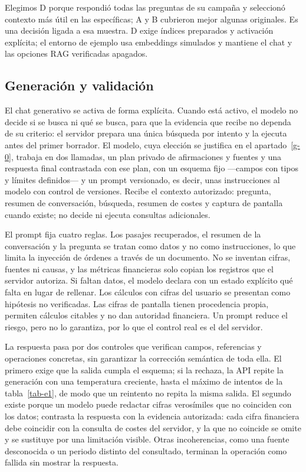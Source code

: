 Elegimos D porque respondió todas las preguntas de su campaña y seleccionó contexto más útil en las específicas; A y B cubrieron mejor algunas originales. Es una decisión ligada a esa muestra. D exige índices preparados y activación explícita; el entorno de ejemplo usa embeddings simulados y mantiene el chat y las opciones RAG verificadas apagados. \cite{despliegue}

\subsection{Generación y validación}\label{e-4}

El chat generativo se activa de forma explícita. Cuando está activo, el modelo no decide si se busca ni qué se busca, para que la evidencia que recibe no dependa de su criterio: el servidor prepara una única búsqueda por intento y la ejecuta antes del primer borrador. El modelo, cuya elección se justifica en el apartado~\ref{g-0}, trabaja en dos llamadas, un plan privado de afirmaciones y fuentes y una respuesta final contrastada con ese plan, con un esquema fijo ---campos con tipos y límites definidos--- y un prompt versionado, es decir, unas instrucciones al modelo con control de versiones. Recibe el contexto autorizado: pregunta, resumen de conversación, búsqueda, resumen de costes y captura de pantalla cuando existe; no decide ni ejecuta consultas adicionales. \cite{arquitectura}

El prompt fija cuatro reglas. Los pasajes recuperados, el resumen de la conversación y la pregunta se tratan como datos y no como instrucciones, lo que limita la inyección de órdenes a través de un documento. No se inventan cifras, fuentes ni causas, y las métricas financieras solo copian los registros que el servidor autoriza. Si faltan datos, el modelo declara con un estado explícito qué falta en lugar de rellenar. Los cálculos con cifras del usuario se presentan como hipótesis no verificadas. Las cifras de pantalla tienen procedencia propia, permiten cálculos citables y no dan autoridad financiera. Un prompt reduce el riesgo, pero no lo garantiza, por lo que el control real es el del servidor. \cite{prompt-chat}

La respuesta pasa por dos controles que verifican campos, referencias y operaciones concretas, sin garantizar la corrección semántica de toda ella. El primero exige que la salida cumpla el esquema; si la rechaza, la API repite la generación con una temperatura creciente, hasta el máximo de intentos de la tabla~\ref{tab-e1}, de modo que un reintento no repita la misma salida. El segundo existe porque un modelo puede redactar cifras verosímiles que no coinciden con los datos; contrasta la respuesta con la evidencia autorizada: cada cifra financiera debe coincidir con la consulta de costes del servidor, y la que no coincide se omite y se sustituye por una limitación visible. Otras incoherencias, como una fuente desconocida o un periodo distinto del consultado, terminan la operación como fallida sin mostrar la respuesta. \cite{codigo-chat}

